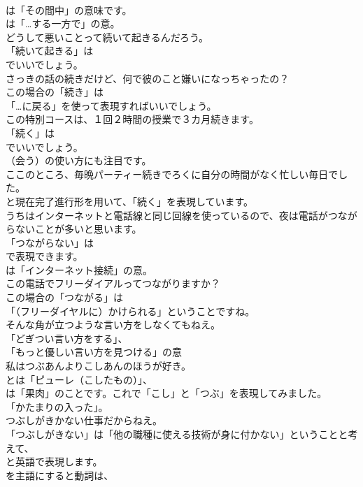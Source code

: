 \documentclass[8pt]{extreport}
\begin{document}
\begin{CJK}{UTF8}{min}
\\	は「その間中」の意味です。
\\	は「…する一方で」の意。	
\\	どうして悪いことって続いて起きるんだろう。 
\\	「続いて起きる」は
\\	でいいでしょう。	
\\	さっきの話の続きだけど、何で彼のこと嫌いになっちゃったの？ 
\\	この場合の「続き」は
\\	「…に戻る」を使って表現すればいいでしょう。	
\\	この特別コースは、１回２時間の授業で３カ月続きます。 
\\	「続く」は 
\\	でいいでしょう。
\\	（会う）の使い方にも注目です。	
\\	ここのところ、毎晩パーティー続きでろくに自分の時間がなく忙しい毎日でした。 
\\	と現在完了進行形を用いて、「続く」を表現しています。	
\\	うちはインターネットと電話線と同じ回線を使っているので、夜は電話がつながらないことが多いと思います。 
\\	「つながらない」は 
\\	で表現できます。
\\	は「インターネット接続」の意。	
\\	この電話でフリーダイアルってつながりますか？ 
\\	この場合の「つながる」は
\\	「（フリーダイヤルに）かけられる」ということですね。	
\\	そんな角が立つような言い方をしなくてもねえ。 
\\	「どぎつい言い方をする」、
\\	「もっと優しい言い方を見つける」の意	
\\	私はつぶあんよりこしあんのほうが好き。 
\\	とは「ピューレ（こしたもの）」、
\\	は「果肉」のことです。これで「こし」と「つぶ」を表現してみました。
\\	「かたまりの入った」。	
\\	つぶしがきかない仕事だからねえ。 
\\	「つぶしがきない」は「他の職種に使える技術が身に付かない」ということと考えて、
\\	と英語で表現します。
\\	を主語にすると動詞は、

\end{CJK}
\end{document}
